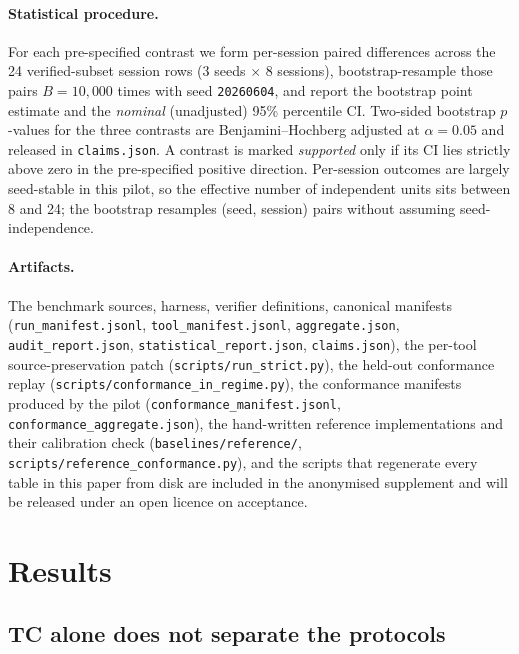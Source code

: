 \documentclass[sigconf,anonymous,natbib=false]{acmart}
\begin{document}
\paragraph{Statistical procedure.}
For each pre-specified contrast we form per-session paired differences across the 24 verified-subset session rows (3 seeds $\times$ 8 sessions), bootstrap-resample those pairs $B{=}10{,}000$ times with seed \texttt{20260604}, and report the bootstrap point estimate and the \emph{nominal} (unadjusted) 95\% percentile CI. Two-sided bootstrap $p$-values for the three contrasts are Benjamini--Hochberg adjusted at $\alpha{=}0.05$ and released in \texttt{claims.json}. A contrast is marked \emph{supported} only if its CI lies strictly above zero in the pre-specified positive direction. Per-session outcomes are largely seed-stable in this pilot, so the effective number of independent units sits between 8 and 24; the bootstrap resamples (seed, session) pairs without assuming seed-independence.

\paragraph{Artifacts.}
The benchmark sources, harness, verifier definitions, canonical manifests (\texttt{run\_manifest.jsonl}, \texttt{tool\_manifest.jsonl}, \texttt{aggregate.json}, \texttt{audit\_report.json}, \texttt{statistical\_report.json}, \texttt{claims.json}), the per-tool source-preservation patch (\texttt{scripts/run\_strict.py}), the held-out conformance replay (\texttt{scripts/conformance\_in\_regime.py}), the conformance manifests produced by the pilot (\texttt{conformance\_manifest.jsonl}, \texttt{conformance\_aggregate.json}), the hand-written reference implementations and their calibration check (\texttt{baselines/reference/}, \texttt{scripts/reference\_conformance.py}), and the scripts that regenerate every table in this paper from disk are included in the anonymised supplement and will be released under an open licence on acceptance.

\section{Results}
\label{sec:results}



\subsection{TC alone does not separate the protocols}
\end{document}
